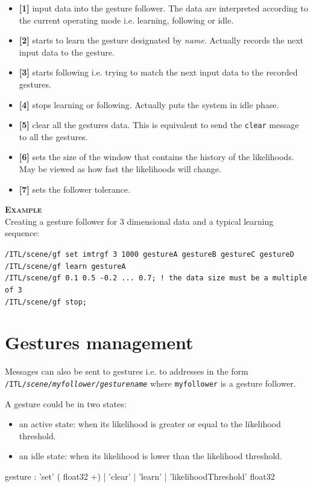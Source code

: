 \documentclass[a4paper,twoside]{report}
\newcommand{\sublevel}[1]	{\section{#1}}
\newcommand{\OSC}[1]		{\texttt{#1}}
\newcommand{\example}		{\textbf{\hspace{-1.5cm}\textbf{\textsc{Example }}}}
\newcommand{\sample}	[1]			{\vspace{-2mm}\begin{center}\colorbox{mygrey}{
								\begin{minipage}[t]{0.9\columnwidth} 
								{\small \texttt{#1}}
								\end{minipage}}\end{center}}
\begin{document}
\begin{itemize}
\item \textbf{[1]} input data into the gesture follower. The data are interpreted according to the current operating mode i.e. learning, following or idle.
\item \textbf{[2]} starts to learn the gesture designated by \emph{name}. Actually records the next input data to the gesture. 
\item \textbf{[3]} starts following i.e. trying to match the next input data to the recorded gestures.
\item \textbf{[4]} stops learning or following. Actually puts the system in idle phase.
\item \textbf{[5]} clear all the gestures data. This is equivalent to send the \OSC{clear} message to all the gestures. 
\item \textbf{[6]} sets the size of the window that contains the history of the likelihoods. May be viewed as how fast the likelihoods	will change.
\item \textbf{[7]} sets the follower tolerance. 
\end{itemize}

\example \\
Creating a gesture follower for 3 dimensional data and a typical learning sequence:
\sample{/ITL/scene/gf set imtrgf 3 1000 gestureA gestureB gestureC gestureD\\
/ITL/scene/gf learn gestureA \\
/ITL/scene/gf 0.1 0.5 -0.2 ... 0.7; ! the data size must be a multiple of 3\\
/ITL/scene/gf stop;
}

\sublevel{Gestures management}\label{gfgestures}

Messages can also be sent to gestures i.e. to addresses in the form \OSC{/ITL/\textit{scene}/\textit{myfollower}/\textit{gesturename}} where \OSC{myfollower} is a gesture follower.

A gesture could be in two states:
\begin{itemize}
\item an active state: when its likelihood is greater or equal to the likelihood threshold.
\item an idle state: when its likelihood is lower than the likelihood threshold.
\end{itemize}

\begin{rail}
gesture : 'set' ( float32 +)
		| 'clear'
		| 'learn'
 		| 'likelihoodThreshold' float32
\end{rail}
\end{document}

